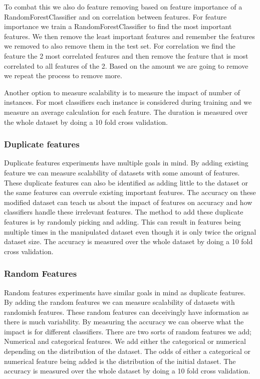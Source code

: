 \documentclass[a4paper,10pt]{article}
\begin{document}
To combat this we also do feature removing based on feature importance of a RandomForestClassifier and on correlation between features. For feature importance we train a RandomForestClassifier to find the most important features. We then remove the least important features and remember the features we removed to also remove them in the test set. For correlation we find the feature the 2 most correlated features and then remove the feature that is most correlated to all features of the 2. Based on the amount we are going to remove we repeat the process to remove more.


Another option  to measure scalability is to measure the impact of number of instances. For most classifiers each instance is considered during training and we measure an average calculation for each feature. The duration is measured over the whole dataset by doing a 10 fold cross validation.

\subsubsection{Duplicate features}
Duplicate features experiments have multiple goals in mind. By adding existing feature we can measure scalability of datasets with some amount of features. These duplicate features can also be identified as adding little to the dataset or the same features can overrule existing important features. The accuracy on these modified dataset
can teach us about the impact of features on accuracy and how classifiers handle these irrelevant features. The method to add these duplicate features is by randomly picking and adding. This can result in features being multiple times in the manipulated  dataset even though it is only twice the orignal dataset size. The accuracy is measured over the whole dataset by doing a 10 fold cross validation.
\subsubsection{Random Features}
Random features experiments have similar goals in mind as duplicate features. By adding the random features we can measure scalability of datasets with randomish features. These random features can deceivingly have information as there is much variability. By measuring the accuracy we can observe what the impact is for different classifiers. There are two sorts of random features we add; Numerical and categorical features. We add either the categorical or numerical depending on the distribution of the dataset. The odds of either a categorical or numerical feature being added is the distribution of the initial dataset. The accuracy is measured over the whole dataset by doing a 10 fold cross validation. %
 
\end{document}
